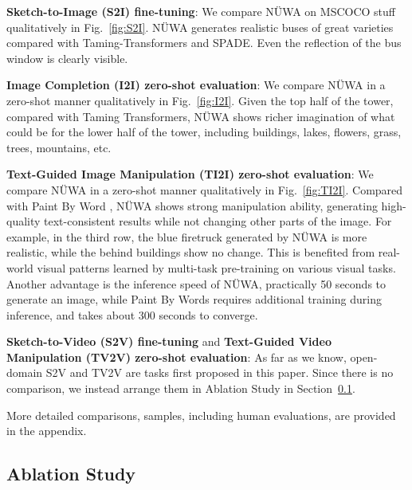 \textbf{Sketch-to-Image (S2I) fine-tuning}: We compare NÜWA on MSCOCO stuff\cite{linMicrosoftCocoCommon2014} qualitatively in Fig.~\ref{fig:S2I}. NÜWA generates realistic buses of great varieties compared with Taming-Transformers\cite{esserTamingTransformersHighResolution2021} and SPADE\cite{parkSemanticImageSynthesis2019}. Even the reflection of the bus window is clearly visible.

\textbf{Image Completion (I2I) zero-shot evaluation}: We compare NÜWA in a zero-shot manner qualitatively in Fig.~\ref{fig:I2I}. Given the top half of the tower, compared with Taming Transformers\cite{esserTamingTransformersHighResolution2021}, NÜWA shows richer imagination of what could be for the lower half of the tower, including buildings, lakes, flowers, grass, trees, mountains, etc.

\textbf{Text-Guided Image Manipulation (TI2I) zero-shot evaluation}: We compare NÜWA in a zero-shot manner qualitatively in Fig.~\ref{fig:TI2I}. Compared with Paint By Word \cite{bauPaintWord2021}, NÜWA shows strong manipulation ability, generating high-quality text-consistent results while not changing other parts of the image. For example, in the third row, the blue firetruck generated by NÜWA is more realistic, while the behind buildings show no change. This is benefited from real-world visual patterns learned by multi-task pre-training on various visual tasks. Another advantage is the inference speed of NÜWA, practically 50 seconds to generate an image, while Paint By Words requires additional training during inference, and takes about 300 seconds to converge.

\textbf{Sketch-to-Video (S2V) fine-tuning} and \textbf{Text-Guided Video Manipulation (TV2V) zero-shot evaluation}: As far as we know, open-domain S2V and TV2V are tasks first proposed in this paper. Since there is no comparison, we instead arrange them in Ablation Study in Section~\ref{sec:abl}.

More detailed comparisons, samples, including human evaluations, are provided in the appendix.

\subsection{Ablation Study}\label{sec:abl}


